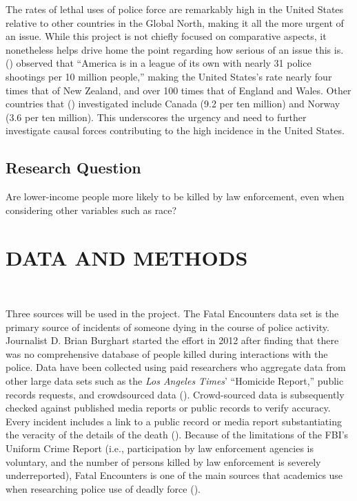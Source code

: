 \documentclass[12pt]{article}
\begin{document}
The rates of lethal uses of police force are remarkably high in the United States relative to other countries in the Global North, making it all the more urgent of an issue. While this project is not chiefly focused on comparative aspects, it nonetheless helps drive home the point regarding how serious of an issue this is. \citeauthor{espinerLicenceKillStartling2022} (\citeyear{espinerLicenceKillStartling2022}) observed that “America is in a league of its own with nearly 31 police shootings per 10 million people,” making the United States’s rate nearly four times that of New Zealand, and over 100 times that of England and Wales. Other countries that \citeauthor{espinerLicenceKillStartling2022} (\citeyear{espinerLicenceKillStartling2022}) investigated include Canada (9.2 per ten million) and Norway (3.6 per ten million). This underscores the urgency and need to further investigate causal forces contributing to the high incidence in the United States.

\subsection{Research Question}

Are lower-income people more likely to be killed by law enforcement, even when considering other variables such as race?

\section{DATA AND METHODS}\

Three sources will be used in the project. The Fatal Encounters data set is the primary source of incidents of someone dying in the course of police activity. Journalist D. Brian Burghart started the effort in 2012 after finding that there was no comprehensive database of people killed during interactions with the police. Data have been collected using paid researchers who aggregate data from other large data sets such as the \textit{Los Angeles Times}’ “Homicide Report,” public records requests, and crowdsourced data (\cite{burghartMeFatalEncounters}). Crowd-sourced data is subsequently checked against published media reports or public records to verify accuracy. Every incident includes a link to a public record or media report substantiating the veracity of the details of the death (\cite{burghartMeFatalEncounters}). Because of the limitations of the FBI’s Uniform Crime Report (i.e., participation by law enforcement agencies is voluntary, and the number of persons killed by law enforcement is severely underreported), Fatal Encounters is one of the main sources that academics use when researching police use of deadly force (\cite{feldmanKilledPoliceValidity2017, feldmanQuantifyingUnderreportingLawenforcementrelated2017, feldmanPoliceRelatedDeathsNeighborhood2019}).
\end{document}
